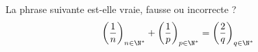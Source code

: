 La phrase suivante est-elle vraie, fausse ou incorrecte ?
  \[\left(\dfrac{1}{n} \right)_{n\in\N^*} + \left(\dfrac{1}{p} \right)_{p\in\N^*}
= \left(\dfrac{2}{q} \right)_{q\in\N^*}\]
